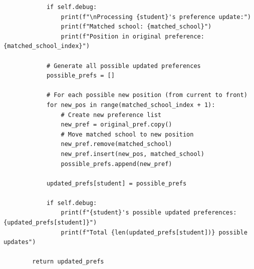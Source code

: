 \documentclass{article}
\begin{document}
\begin{verbatim}
            if self.debug:
                print(f"\nProcessing {student}'s preference update:")
                print(f"Matched school: {matched_school}")
                print(f"Position in original preference: {matched_school_index}")
            
            # Generate all possible updated preferences
            possible_prefs = []
            
            # For each possible new position (from current to front)
            for new_pos in range(matched_school_index + 1):
                # Create new preference list
                new_pref = original_pref.copy()
                # Move matched school to new position
                new_pref.remove(matched_school)
                new_pref.insert(new_pos, matched_school)
                possible_prefs.append(new_pref)
                
            updated_prefs[student] = possible_prefs
            
            if self.debug:
                print(f"{student}'s possible updated preferences: {updated_prefs[student]}")
                print(f"Total {len(updated_prefs[student])} possible updates")
            
        return updated_prefs
\end{verbatim}
\end{document}
